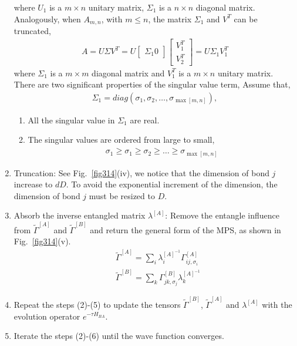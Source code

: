 \begin{enumerate}
		where $U_1$ is a $m \times n$ unitary matrix, $\Sigma_1$ is a $n \times n$ diagonal matrix. Analogously, when $A_{m,n}$, with $m \leq n$, the matrix $\Sigma_1$ and $V^T$ can be truncated,
\begin{align}
	A = U \Sigma V^T = U \begin{bmatrix} \Sigma_1 0 \end{bmatrix} \begin{bmatrix} V_1^T \\ V_2^T \end{bmatrix} = U \Sigma_1 V_1^T
\end{align}
where $\Sigma_1$ is a $m \times m$ diagonal matrix and $V_1^T$ is a $m \times n$ unitary matrix. There are two significant properties of the singular value term, Assume that,
\begin{align}
\Sigma_1 = diag \left(\sigma_1, \sigma_2, \dots, \sigma_{\max{[m,n]}} \right), 
\end{align}
\begin{enumerate}
	\item All the singular value in $\Sigma_1$ are real.
	\item The singular values are ordered from large to small,
		\begin{align}
			\sigma_1 \geq \sigma_1 \geq \sigma_2 \geq \dots \geq \sigma_{\max{[m,n]}}
		\end{align}
\end{enumerate}
		\item Truncation: See Fig.~\ref{fig314}(iv), we notice that the dimension of bond $j$ increase to $dD$. To avoid the exponential increment of the dimension, the dimension of bond $j$ must be resized to $D$.
		\item Absorb the inverse entangled matrix $\lambda^{[A]}$: Remove the entangle influence from $\widetilde{\Gamma}^{[A]}$ and $\widetilde{\Gamma}^{[B]}$ and return the general form of the MPS, as shown in Fig.~\ref{fig314}(v).
			\begin{align}
				&\widetilde{\Gamma}^{[A]} = \sum_{i}{ \lambda_{i}^{[A]^{-1}} \Gamma^{[A]}_{ij,\sigma_i}} \\
				&\widetilde{\Gamma}^{[B]} = \sum_{k}{\Gamma^{[B]}_{jk,\sigma_j} \lambda_{k}^{[A]^{-1}}}
			\end{align}
		\item Repeat the steps (2)-(5) to update the tensors $\widetilde{\Gamma}^{[B]}$, $\widetilde{\Gamma}^{[A]}$ and $\lambda^{[A]}$ with the evolution operator $e^{-\tau H_{BA}}$.
		\item Iterate the steps (2)-(6) until the wave function converges.
\end{enumerate}

